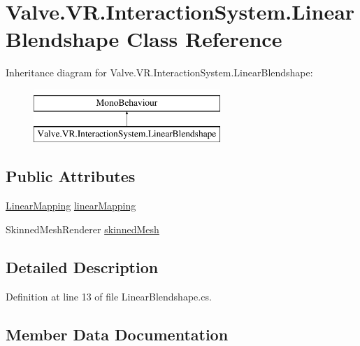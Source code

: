 \hypertarget{class_valve_1_1_v_r_1_1_interaction_system_1_1_linear_blendshape}{}\section{Valve.\+V\+R.\+Interaction\+System.\+Linear\+Blendshape Class Reference}
\label{class_valve_1_1_v_r_1_1_interaction_system_1_1_linear_blendshape}
Inheritance diagram for Valve.\+V\+R.\+Interaction\+System.\+Linear\+Blendshape\+:\begin{figure}[H]
\begin{center}
\leavevmode
\includegraphics[height=2.000000cm]{class_valve_1_1_v_r_1_1_interaction_system_1_1_linear_blendshape}
\end{center}
\end{figure}
\subsection*{Public Attributes}
\begin{DoxyCompactItemize}
\item 
\mbox{\hyperlink{class_valve_1_1_v_r_1_1_interaction_system_1_1_linear_mapping}{Linear\+Mapping}} \mbox{\hyperlink{class_valve_1_1_v_r_1_1_interaction_system_1_1_linear_blendshape_a12bcbb31129bdf66213c9259dd6584e8}{linear\+Mapping}}
\item 
Skinned\+Mesh\+Renderer \mbox{\hyperlink{class_valve_1_1_v_r_1_1_interaction_system_1_1_linear_blendshape_a0e9a4a8134d5de1e2817eef0622607e6}{skinned\+Mesh}}
\end{DoxyCompactItemize}


\subsection{Detailed Description}


Definition at line 13 of file Linear\+Blendshape.\+cs.



\subsection{Member Data Documentation}
\mbox{\label{class_valve_1_1_v_r_1_1_interaction_system_1_1_linear_blendshape_a12bcbb31129bdf66213c9259dd6584e8}} 
